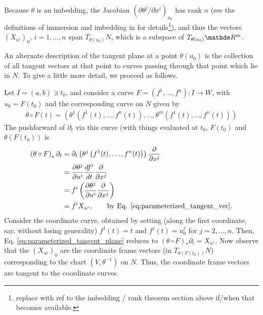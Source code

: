 Because $\theta$ is an imbedding, the Jacobian $\left(\partial \theta^j / \partial x^i\right)_{u_0}$ has rank $n$ (see the definitions of immersion and imbedding in \cite{boothby_2002} for details\footnote{{\color{red}replace with ref to the imbedding / rank theorem section above if/when that becomes available.}}), and thus the vectors $ \left(X_{u^i}\right)_0$, $i=1,\dots, n$ span $T_{\theta(u_0)}N$, which is a subspace of $T_{\theta(u_0)}\R^m$. 

An alternate description of the tangent plane at a point $\theta(u_0)$ is the collection of all tangent vectors at that point to curves passing through that point which lie in $N$. To give a little more detail, we proceed as follows. 

Let $I = (a, b) \ni t_0$, and consider a curve $F = \left(f^1, \dots, f^n\right) : I \rightarrow W$, with $u_0 = F(t_0)$ and the corresponding curve on $N$ given by 
\begin{align}
\theta \circ F(t) = \left(\theta^1(f^1(t), \dots, f^n(t)), \dots, \theta^m(f^1(t), \dots, f^n(t))\right)
\end{align}
The pushforward of $\partial_{t}$ via this curve (with things evaluated at $t_0$, $F(t_0)$ and $\theta(F(t_0))$ is
\begin{equation}\begin{aligned}\label{eq:parameterized_tangent_plane}
\left(\theta\circ F\right)_* \partial_{t} &={} \partial_{t}\left(\theta^j\left(f^1(t), \dots, f^n(t)\right)\right)\frac{\partial}{\partial x^j}\\
&={} \frac{\partial \theta^j}{\partial u^i}\frac{d f^i}{dt}\frac{\partial}{\partial x^j}\\
&={} \dot f^i \left(\frac{\partial \theta^j}{\partial u^i}\frac{\partial}{\partial x^j}\right)\\
&={} \dot f^i X_{u^i}, \qquad \text{by Eq. \ref{eq:parameterized_tangent_vec}.}
\end{aligned}\end{equation}
Consider the coordinate curve, obtained by setting (along the first coordinate, say, without losing generality) $f^1(t) = t$ and $f^j(t) = u^j_0$ for $j = 2, \dots, n$. Then, Eq. \ref{eq:parameterized_tangent_plane} reduces to $\left(\theta\circ F\right)_* \partial_{t} = X_{u^1}$. Now observe that the $(X_{u^j})_0$ are the coordinate frame vectors (in $T_{\theta(F(t_0))}N$) corresponding to the chart $(V, \theta^{-1})$ on $N$. {Thus, the coordinate frame vectors are tangent to the coordinate curves.}

